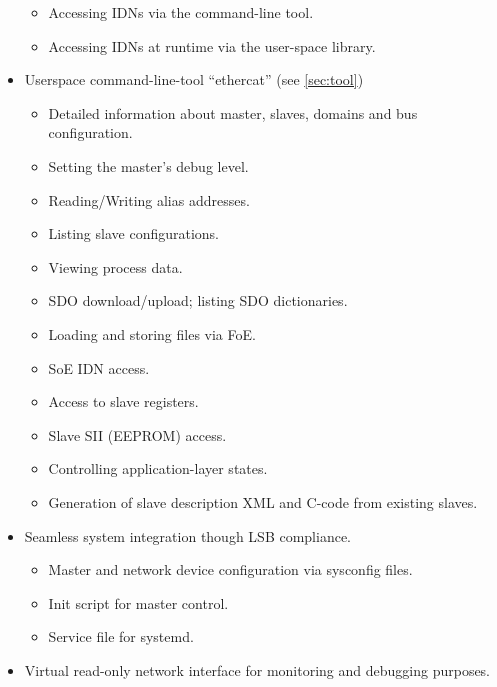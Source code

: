 \documentclass[a4paper,12pt,BCOR6mm,bibtotoc,idxtotoc]{scrbook}
\begin{document}
\begin{itemize}
\begin{itemize}
  \item Accessing IDNs via the command-line tool.

  \item Accessing IDNs at runtime via the user-space library.

  \end{itemize}

\item Userspace command-line-tool ``ethercat'' (see \autoref{sec:tool})

  \begin{itemize}

  \item Detailed information about master, slaves, domains and bus
  configuration.
  \item Setting the master's debug level.
  \item Reading/Writing alias addresses.
  \item Listing slave configurations.
  \item Viewing process data.
  \item SDO download/upload; listing SDO dictionaries.
  \item Loading and storing files via FoE.
  \item SoE IDN access.
  \item Access to slave registers.
  \item Slave SII (EEPROM) access.
  \item Controlling application-layer states.
  \item Generation of slave description XML and C-code from existing slaves.

  \end{itemize}

\item Seamless system integration though LSB compliance.

  \begin{itemize}

  \item Master and network device configuration via sysconfig files.

  \item Init script for master control.

  \item Service file for systemd.

  \end{itemize}

\item Virtual read-only network interface for monitoring and debugging
  purposes.

\end{itemize}
\end{document}
